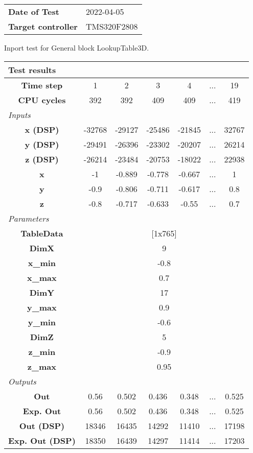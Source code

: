 \begin{tabular}{l l}
\textbf{Date of Test} & 2022-04-05 \tabularnewline
\textbf{Target controller} & TMS320F2808 \tabularnewline
\end{tabular}
\vspace{1ex}
Inport test for General block LookupTable3D.

\vspace{1em}
\begin{tabularx}{\textwidth}{|c|c|c|c|c|>{\centering\arraybackslash}X|c|}
\hline
\multicolumn{7}{|l|}{\cellcolor[gray]{0.8}\textbf{Test results}} \tabularnewline \hline
\textbf{Time step} & 1 & 2 & 3 & 4 & ... & 19 \tabularnewline \hline
\textbf{CPU cycles} & 392 & 392 & 409 & 409 & ... & 419 \tabularnewline \hline
\multicolumn{7}{|l|}{\cellcolor[gray]{0.9}\textit{Inputs}} \tabularnewline \hline
\textbf{x (DSP)} & -32768 & -29127 & -25486 & -21845 & ... & 32767 \tabularnewline \hline
\textbf{y (DSP)} & -29491 & -26396 & -23302 & -20207 & ... & 26214 \tabularnewline \hline
\textbf{z (DSP)} & -26214 & -23484 & -20753 & -18022 & ... & 22938 \tabularnewline \hline
\textbf{x} & -1 & -0.889 & -0.778 & -0.667 & ... & 1 \tabularnewline \hline
\textbf{y} & -0.9 & -0.806 & -0.711 & -0.617 & ... & 0.8 \tabularnewline \hline
\textbf{z} & -0.8 & -0.717 & -0.633 & -0.55 & ... & 0.7 \tabularnewline \hline
\multicolumn{7}{|l|}{\cellcolor[gray]{0.9}\textit{Parameters}} \tabularnewline \hline
\textbf{TableData} & \multicolumn{6}{c|}{[1x765]} \tabularnewline \hline
\textbf{DimX} & \multicolumn{6}{c|}{9} \tabularnewline \hline
\textbf{x\_min} & \multicolumn{6}{c|}{-0.8} \tabularnewline \hline
\textbf{x\_max} & \multicolumn{6}{c|}{0.7} \tabularnewline \hline
\textbf{DimY} & \multicolumn{6}{c|}{17} \tabularnewline \hline
\textbf{y\_max} & \multicolumn{6}{c|}{0.9} \tabularnewline \hline
\textbf{y\_min} & \multicolumn{6}{c|}{-0.6} \tabularnewline \hline
\textbf{DimZ} & \multicolumn{6}{c|}{5} \tabularnewline \hline
\textbf{z\_min} & \multicolumn{6}{c|}{-0.9} \tabularnewline \hline
\textbf{z\_max} & \multicolumn{6}{c|}{0.95} \tabularnewline \hline
\multicolumn{7}{|l|}{\cellcolor[gray]{0.9}\textit{Outputs}} \tabularnewline \hline
\textbf{Out} & 0.56 & 0.502 & 0.436 & 0.348 & ... & 0.525 \tabularnewline \hline
\textbf{Exp. Out} & 0.56 & 0.502 & 0.436 & 0.348 & ... & 0.525 \tabularnewline \hline
\textbf{Out (DSP)} & 18346 & 16435 & 14292 & 11410 & ... & 17198 \tabularnewline \hline
\textbf{Exp. Out (DSP)} & 18350 & 16439 & 14297 & 11414 & ... & 17203 \tabularnewline \hline
\end{tabularx}
\vspace{1ex}

